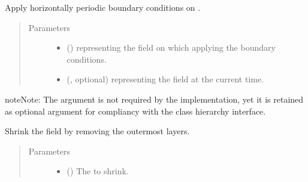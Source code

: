 \documentclass[letterpaper,10pt,english]{sphinxmanual}
\begin{document}
\begin{fulllineitems}
\begin{fulllineitems}
\label{\detokenize{api:dycore.horizontal_boundary.Periodic.apply}}
Apply horizontally periodic boundary conditions on .
\begin{quote}\begin{description}
\item[{Parameters}] \leavevmode\begin{itemize}
\item {} 
 () \textendash{}  representing the field on which applying the boundary conditions.

\item {} 
 (, optional) \textendash{}  representing the field at the current time.

\end{itemize}

\end{description}\end{quote}

\begin{sphinxadmonition}{note}{Note:}
The argument  is not required by the implementation, yet it is retained as optional
argument for compliancy with the class hierarchy interface.
\end{sphinxadmonition}

\end{fulllineitems}


\begin{fulllineitems}
\label{\detokenize{api:dycore.horizontal_boundary.Periodic.from_computational_to_physical_domain}}
Shrink the field  by removing the  outermost layers.
\begin{quote}\begin{description}
\item[{Parameters}] \leavevmode\begin{itemize}
\item {} 
 () \textendash{} The  to shrink.


\end{itemize}
\end{description}
\end{quote}
\end{fulllineitems}
\end{fulllineitems}
\end{document}
